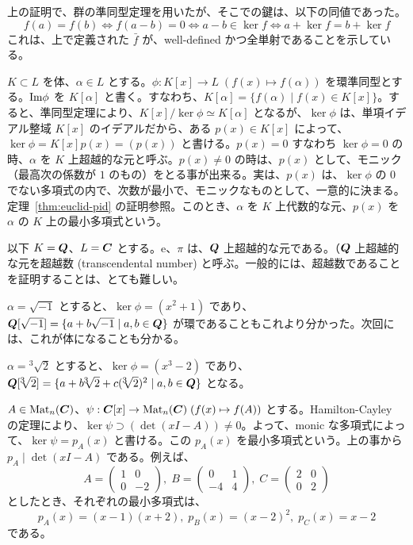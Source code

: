 \medskip
上の証明で、群の準同型定理を用いたが、そこでの鍵は、以下の同値であった。
$$f(a) = f(b) \Leftrightarrow f(a-b) = 0 \Leftrightarrow a-b\in \ker f \Leftrightarrow a+\ker f = b + \ker f$$
これは、上で定義された $\bar{f}$ が、well-defined かつ全単射であることを示している。

\begin{eg}
$K\subset L$  を体、$\alpha\in L$ とする。$\phi:K[x] \to L \;(f(x) \mapsto f(\alpha))$ を環準同型とする。$\mbox{{\rm Im}}\phi$  を $K[\alpha]$ と書く。すなわち、$K[\alpha] = \{f(\alpha)\mid f(x)\in K[x]\}$。すると、準同型定理により、$K[x]/\ker\phi\simeq K[\alpha]$ となるが、$\ker\phi$  は、単項イデアル整域 $K[x]$ のイデアルだから、ある $p(x)\in K[x]$ によって、$\ker\phi = K[x]p(x) = (p(x))$ と書ける。$p(x) = 0$ すなわち $\ker\phi = 0$ の時、$\alpha$ を $K$ 上超越的な元と呼ぶ。$p(x)\neq 0$ の時は、$p(x)$ として、モニック（最高次の係数が $1$ のもの）をとる事が出来る。実は、$p(x)$ は、$\ker\phi$ の $0$ でない多項式の内で、次数が最小で、モニックなものとして、一意的に決まる。定理~\ref{thm:euclid-pid} の証明参照。このとき、$\alpha$ を $K$ 上代数的な元、$p(x)$ を $\alpha$ の $K$ 上の最小多項式という。

以下 $K = \mbox{\boldmath $Q$}$、$L = \mbox{\boldmath $C$}$ とする。$\mbox{e}$、$\pi$ は、$\mbox{\boldmath $Q$}$ 上超越的な元である。（$\mbox{\boldmath $Q$}$ 上超越的な元を超越数 (transcendental number) と呼ぶ。一般的には、超越数であることを証明することは、とても難しい。

$\alpha = \sqrt{-1}$ とすると、$\ker\phi = (x^2 + 1)$ であり、$\mbox{\boldmath $Q$}[\sqrt{-1}] = \{a + b\sqrt{-1}\mid a,b\in \mbox{\boldmath $Q$}\}$ が環であることもこれより分かった。次回には、これが体になることも分かる。

$\alpha = {}^3\!\!\sqrt{2}$ とすると、$\ker\phi = (x^3 -2)$ であり、$\mbox{\boldmath $Q$}[{}^3\!\!\sqrt{2}] = \{a + b{}^3\!\!\sqrt{2} + c({}^3\!\!\sqrt{2})^2\mid a,b\in\mbox{\boldmath $Q$}\}$ となる。
\end{eg}

\begin{eg}
$A\in\mbox{{\rm Mat}}_n(\mbox{\boldmath $C$})$、$\psi:\mbox{\boldmath $C$}[x]\to \mbox{{\rm Mat}}_n(\mbox{\boldmath $C$})\;(f(x)\mapsto f(A))$ とする。Hamilton-Cayley の定理により、$\ker\psi\supset (\det(xI - A))\neq 0$。よって、monic な多項式によって、$\ker\psi = p_A(x)$ と書ける。この $p_A(x)$ を最小多項式という。上の事から $p_A\mid \det(xI - A)$ である。例えば、
$$A = \left(\begin{array}{cc} 1 & 0 \\ 0 & -2\end{array}\right),\; B = \left(\begin{array}{cc} 0 & 1 \\ -4 & 4\end{array}\right),\;C = \left(\begin{array}{cc} 2 & 0 \\ 0 & 2\end{array}\right)$$
としたとき、それぞれの最小多項式は、
$$p_A(x) = (x-1)(x+2), \; p_B(x) = (x-2)^2,\;p_C(x) = x-2$$
である。
\end{eg}

